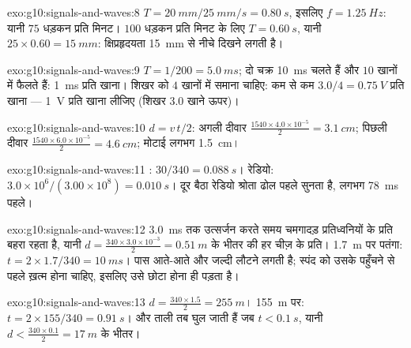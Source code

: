 \begin{solution}{exo:g10:signals-and-waves:8}
$T = \qty{20}{mm}/\qty{25}{mm/s} = \qty{0.80}{s}$, इसलिए $f = \qty{1.25}{Hz}$: यानी $75$ धड़कन प्रति मिनट। $100$ धड़कन प्रति
मिनट के लिए $T = \qty{0.60}{s}$, यानी $25 \times 0.60 = \qty{15}{mm}$: क्षिप्रहृदयता \qty{15}{mm} से नीचे दिखने
लगती है।
\end{solution}

\begin{solution}{exo:g10:signals-and-waves:9}
$T = 1/200 = \qty{5.0}{ms}$; दो चक्र \qty{10}{ms} चलते हैं और $10$ खानों में फैलते हैं:
 \qty{1}{ms} प्रति खाना। शिखर को $4$ खानों में समाना
चाहिए:  कम से कम $3.0/4 = \qty{0.75}{V}$ प्रति खाना --- \qty{1}{V} प्रति खाना
लीजिए (शिखर $3.0$ खाने ऊपर)।
\end{solution}

\begin{solution}{exo:g10:signals-and-waves:10}
$d = v\,t/2$: अगली दीवार $\frac{1540 \times 4.0\times10^{-5}}{2} = \qty{3.1}{cm}$; पिछली दीवार $\frac{1540 \times 6.0\times10^{-5}}{2} = \qty{4.6}{cm}$; मोटाई लगभग \qty{1.5}{cm}।
\end{solution}

\begin{solution}{exo:g10:signals-and-waves:11}
: $30/340 = \qty{0.088}{s}$। रेडियो: $3.0\times10^{6}/(3.00\times10^{8}) = \qty{0.010}{s}$। दूर बैठा रेडियो श्रोता ढोल पहले
सुनता है, लगभग \qty{78}{ms} पहले।
\end{solution}

\begin{solution}{exo:g10:signals-and-waves:12}
\qty{3.0}{ms} तक उत्सर्जन करते समय चमगादड़ प्रतिध्वनियों के प्रति बहरा
रहता है, यानी $d = \frac{340 \times 3.0\times10^{-3}}{2} =
\qty{0.51}{m}$ के भीतर की हर चीज़ के प्रति। \qty{1.7}{m} पर पतंगा:
$t = 2 \times 1.7/340 = \qty{10}{ms}$। पास आते-आते  और जल्दी लौटने लगती है; स्पंद को
उसके पहुँचने से पहले ख़त्म होना चाहिए, इसलिए उसे छोटा होना ही पड़ता है।
\end{solution}

\begin{solution}{exo:g10:signals-and-waves:13}
$d = \frac{340 \times 1.5}{2} = \qty{255}{m}$। \qty{155}{m} पर: $t = 2 \times 155/340 = \qty{0.91}{s}$।  और ताली तब घुल जाती हैं
जब $t < \qty{0.1}{s}$, यानी $d < \frac{340 \times 0.1}{2} = \qty{17}{m}$ के भीतर।
\end{solution}

